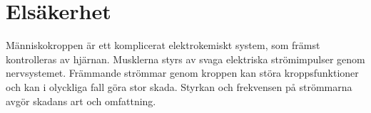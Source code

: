 \chapter{Elsäkerhet}
\label{ch:elsakerhet}

Människokroppen är ett komplicerat elektrokemiskt system, som främst
kontrolleras av hjärnan.
Musklerna styrs av svaga elektriska strömimpulser genom nervsystemet.
Främmande strömmar genom kroppen kan störa kroppsfunktioner och kan i olyckliga
fall göra stor skada.
Styrkan och frekvensen på strömmarna avgör skadans art och omfattning.
